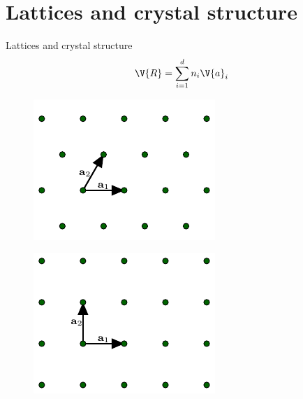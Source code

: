 \documentclass{beamer}
\begin{document}
\section{Lattices and crystal structure}
\begin{frame}{Lattices and crystal structure}
\begin{equation*}
	\V{R} = \sum_{i = 1}^{d} n_i \V{a}_i
\end{equation*}
\begin{figure}[H]
	\centering
	\begin{minipage}{.4\textwidth}
		\centering
		\includegraphics[width=\linewidth]{figures/triangular.pdf}
		\label{fig:triangular_lattice}
	\end{minipage}%
	\hfill
	\begin{minipage}{.4\textwidth}
		\centering
		\includegraphics[width=\linewidth]{figures/square.pdf}
		\label{fig:square_lattice}
	\end{minipage}
\end{figure}
\end{frame}
\end{document}
